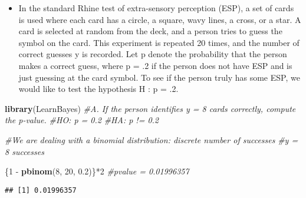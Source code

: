 \documentclass[]{tufte-handout}
\newenvironment{Shaded}{}{}
\newcommand{\KeywordTok}[1]{\textcolor[rgb]{0.00,0.44,0.13}{\textbf{{#1}}}}
\newcommand{\DecValTok}[1]{\textcolor[rgb]{0.25,0.63,0.44}{{#1}}}
\newcommand{\FloatTok}[1]{\textcolor[rgb]{0.25,0.63,0.44}{{#1}}}
\newcommand{\StringTok}[1]{\textcolor[rgb]{0.25,0.44,0.63}{{#1}}}
\newcommand{\CommentTok}[1]{\textcolor[rgb]{0.38,0.63,0.69}{\textit{{#1}}}}
\newcommand{\NormalTok}[1]{{#1}}
\begin{document}
\begin{itemize}
\itemsep1pt\parskip0pt
\item
  In the standard Rhine test of extra-sensory perception (ESP), a set of
  cards is used where each card has a circle, a square, wavy lines, a
  cross, or a star. A card is selected at random from the deck, and a
  person tries to guess the symbol on the card. This experiment is
  repeated 20 times, and the number of correct guesses y is recorded.
  Let p denote the probability that the person makes a correct guess,
  where p = .2 if the person does not have ESP and is just guessing at
  the card symbol. To see if the person truly has some ESP, we would
  like to test the hypothesis H : p = .2.
\end{itemize}

\begin{Shaded}
\begin{Highlighting}[]
\KeywordTok{library}\NormalTok{(LearnBayes)}
\CommentTok{#A. If the person identifies y = 8 cards correctly, compute the p-value.}
\CommentTok{#HO: p = 0.2}
\CommentTok{#HA: p != 0.2}

\CommentTok{#We are dealing with a binomial distribution: discrete number of successes}
\CommentTok{#y = 8 successes}

\NormalTok{\{}\DecValTok{1} \NormalTok{-}\StringTok{ }\KeywordTok{pbinom}\NormalTok{(}\DecValTok{8}\NormalTok{, }\DecValTok{20}\NormalTok{, }\FloatTok{0.2}\NormalTok{)\}*}\DecValTok{2} \CommentTok{#pvalue =  0.01996357}
\end{Highlighting}
\end{Shaded}

\begin{verbatim}
## [1] 0.01996357
\end{verbatim}
\end{document}
